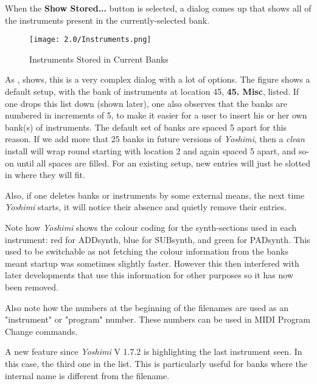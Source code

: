    When the \textbf{Show Stored...} button is selected, a dialog comes
   up that shows all of the instruments present in the currently-selected
   bank.

\begin{figure}[H]
   \centering
   \texttt{[image: 2.0/Instruments.png]}
   \caption[Show Stored Instruments]{Instruments Stored in Current Banks}
   \label{fig:instruments_show_stored}
\end{figure}

   As ,
   shows, this is a very complex dialog with a lot of options.
   The figure shows a default setup, with the bank of instruments at location
   45, \textbf{45. Misc}, listed.
   If one drops this list down (shown later), one also observes that the banks
   are numbered in increments of 5, to make it easier for a user to insert his
   or her own bank(s) of instruments. The default set of banks are spaced 5
   apart for this reason. If we add more that 25 banks in future versions of
   \textsl{Yoshimi}, then a \textsl{clean} install will wrap round starting with
   location 2 and again spaced 5 apart, and so-on until all spaces are filled.
   For an existing setup, new entries will just be slotted in where they
   will fit.

   Also, if one deletes banks or instruments by some external means, the next
   time \textsl{Yoshimi} starts, it will notice their absence and quietly
   remove their entries.

   Note how \textsl{Yoshimi} shows the colour coding for the
   synth-sections used in each instrument:
   red for ADDsynth, blue for SUBsynth, and green for PADsynth.
   This used to be switchable as not fetching the colour information from the
   banks meant startup was sometimes slightly faster. However this then
   interfered with later developments that use this information for other
   purposes so it has now been removed.

   Also note how the numbers at the beginning of the filenames are used as
   an "instrument" or "program" number.  These numbers can be used in MIDI
   Program Change commands.

   A new feature since \textsl{Yoshimi} V 1.7.2 is highlighting the last
   instrument seen. In this case, the third one in the list. This is
   particularly useful for banks where the internal name is different from the
   filename.

